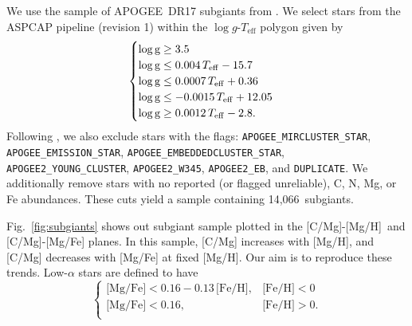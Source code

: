 \documentclass[fleqn,
referee, %
usenatbib]{mnras}
\newcommand{\nsubgiants}{14,066}
\newcommand{\apogee}{APOGEE}
\newcommand{\caah}{[C/Mg]-[Mg/H]}
\newcommand{\caafe}{[C/Mg]-[Mg/Fe]}
\begin{document}
We use the sample of \apogee\ DR17 subgiants from \citet{jack}. We select stars from the ASPCAP pipeline (revision 1) within the $\log g$-$T_\text{eff}$ polygon given by
 \begin{equation}
    \begin{cases} \label{eq:subgiant_selection}
        \log \text{g} \geq 3.5 \\
        \log \text{g} \leq 0.004\,T_{\rm eff} - 15.7 \\
        \log \text{g} \leq 0.0007\,T_{\rm eff} + 0.36 \\
        \log \text{g} \leq -0.0015\,T_{\rm eff} + 12.05 \\
        \log \text{g} \geq 0.0012\,T_{\rm eff} - 2.8. \\
    \end{cases}
\end{equation}
Following \citet{jack}, we also exclude stars with the flags:
        \verb|APOGEE_MIRCLUSTER_STAR|,
        \verb|APOGEE_EMISSION_STAR|,
        \verb|APOGEE_EMBEDDEDCLUSTER_STAR|,
        \verb|APOGEE2_YOUNG_CLUSTER|,
        \verb|APOGEE2_W345|,
        \verb|APOGEE2_EB|, and
        \verb|DUPLICATE|.
We additionally remove stars with no reported (or flagged unreliable), C, N, Mg, or Fe abundances. These cuts yield a sample containing \nsubgiants\ subgiants.


Fig.~\ref{fig:subgiants} shows out subgiant sample plotted in the \caah\ and \caafe{} planes.\footnotemark{} In this sample, [C/Mg] increases with [Mg/H], and [C/Mg] decreases with [Mg/Fe] at fixed [Mg/H]. Our aim is to reproduce these trends.
Low-$\alpha$ stars are defined to have 
\begin{equation}\label{eq:high_alpha}
\begin{cases}
\text{[Mg/Fe]} <0.16-0.13\,\text{[Fe/H]}, & \text{[Fe/H]}<0\\
\text{[Mg/Fe]} <0.16, & \text{[Fe/H]}>0. \\
\end{cases}
\end{equation}


\end{document}
